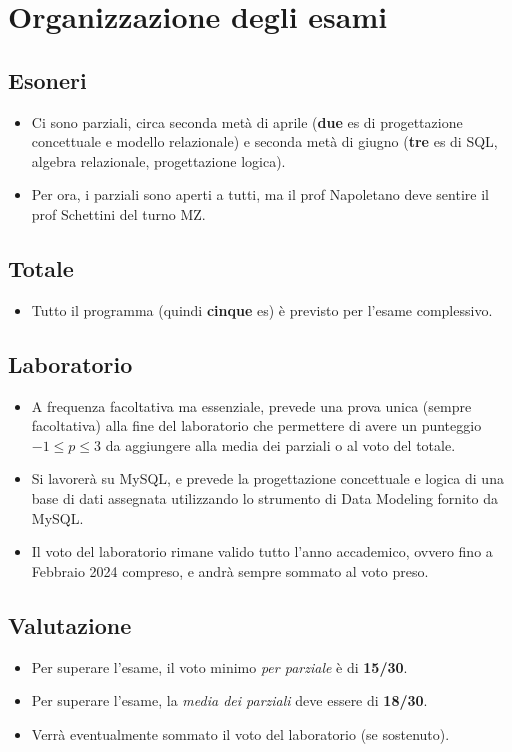 \section{Organizzazione degli esami}
\subsection{Esoneri}
\begin{itemize}
    \item Ci sono parziali, circa seconda metà di aprile (\textbf{due} es di progettazione concettuale e modello relazionale) e seconda metà di giugno (\textbf{tre} es di SQL, algebra relazionale, progettazione logica).
    \item Per ora, i parziali sono aperti a tutti, ma il prof Napoletano deve sentire il prof Schettini del turno MZ.
\end{itemize}

\subsection{Totale}
\begin{itemize}
    \item Tutto il programma (quindi \textbf{cinque} es) è previsto per l'esame complessivo.
\end{itemize}

\subsection{Laboratorio}
\begin{itemize}
    \item A frequenza facoltativa ma essenziale, prevede una prova unica (sempre facoltativa) alla fine del laboratorio che permettere di avere un punteggio $-1 \leq p \leq 3$ da aggiungere alla media dei parziali o al voto del totale.
    \item Si lavorerà su MySQL, e prevede la progettazione concettuale e logica di una base di dati assegnata utilizzando lo strumento di Data Modeling fornito da MySQL.
    \item Il voto del laboratorio rimane valido tutto l'anno accademico, ovvero fino a Febbraio 2024 compreso, e andrà sempre sommato al voto preso.
\end{itemize}

\subsection{Valutazione}
\begin{itemize}
    \item Per superare l'esame, il voto minimo \textit{per parziale} è di \textbf{15/30}.
    \item Per superare l'esame, la \textit{media dei parziali} deve essere di \textbf{18/30}.
    \item Verrà eventualmente sommato il voto del laboratorio (se sostenuto).
\end{itemize}

